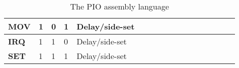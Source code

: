 \begin{table}[]
\begin{tabular}{|l|l|l|l|lllll|l|l|l|l|l|l|l|l|}
        \textbf{MOV}  & 1  & 0  & 1  & Delay/side-set          &                         &                         &                        &           &           &           &           &           &           &           &           &           \\ \hline
        \textbf{IRQ}  & 1  & 1  & 0  & Delay/side-set          &                         &                         &                        &           &           &           &           &           &           &           &           &           \\ \hline
        \textbf{SET}  & 1  & 1  & 1  & Delay/side-set          &                         &                         &                        &           &           &           &           &           &           &           &           &           \\ \hline
    \end{tabular}
    \caption{The PIO assembly language}
    \label{tab:pioasm}
\end{table}
